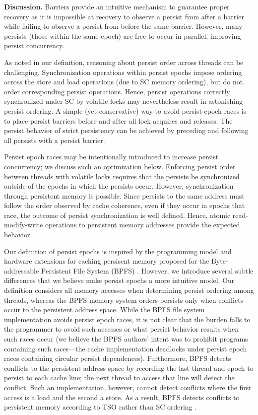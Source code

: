 \textbf{Discussion.}
Barriers provide an intuitive mechanism to guarantee proper recovery as it is impossible at recovery to observe a persist from after a barrier while failing to observe a persist from before the same barrier.
However, many persists (those within the same epoch) are free to occur in parallel, improving persist concurrency.

As noted in our definition, reasoning about persist order across threads can be challenging.
Synchronization operations within persist epochs impose ordering across the store and load operations (due to SC memory ordering), but do not order corresponding persist operations.
Hence, persist operations correctly synchronized under SC by volatile locks may nevertheless result in astonishing persist ordering.
A simple (yet conservative) way to avoid persist epoch races is to place persist barriers before and after all lock acquires and releases.
The persist behavior of strict persistency can be achieved by preceding and following all persists with a persist barrier.

Persist epoch races may be intentionally introduced to increase persist concurrency; we discuss such an optimization below.
Enforcing persist order between threads with volatile locks requires that the persists be synchronized outside of the epochs in which the persists occur.
However, synchronization through persistent memory is possible.
Since persists to the same address must follow the order observed by cache coherence, even if they occur in epochs that race, the outcome of persist synchronization is well defined.
Hence, atomic read-modify-write operations to persistent memory addresses provide the expected behavior.

Our definition of persist epochs is inspired by the programming model and hardware extensions for caching persisent memory proposed for the Byte-addressable Persistent File System (BPFS) \cite{Condit09}.
However, we introduce several subtle differences that we believe make persist epochs a more intuitive model.
Our definition considers all memory accesses when determining persist ordering among threads, whereas the BPFS memory system orders persists only when conflicts occur to the persistent address space.
While the BPFS file system implementation avoids persist epoch races, it is not clear that the burden falls to the programmer to avoid such accesses or what persist behavior results when such races occur (we believe the BPFS authors' intent was to prohibit programs containing such races---the cache implementation deadlocks under persist epoch races containing circular persist dependences).  
Furthermore, BPFS detects conflicts to the persistent address space by recording the last thread and epoch to persist to each cache line; the next thread to access that line will detect the conflict.
Such an implementation, however, cannot detect conflicts where the first access is a load and the second a store.
As a result, BPFS detects conflicts to persistent memory according to TSO rather than SC ordering \cite{SPARCv9}.


